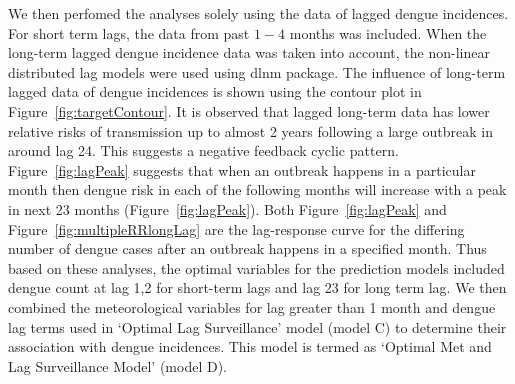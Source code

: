 \documentclass{bmcart}
\begin{document}
We then perfomed the analyses solely using the data of lagged dengue incidences. For short term lags, the data from past $1-4$ months was included. When the long-term lagged dengue incidence data was taken into account, the non-linear distributed lag models were used using dlnm package\cite{gasparrini2011distributed}. The influence of long-term lagged data of dengue incidences is shown using the contour plot in Figure~\ref{fig:targetContour}. It is observed that lagged long-term data has lower relative risks of transmission up to almost 2 years following a large outbreak in around lag 24. This suggests a negative feedback cyclic pattern. Figure~\ref{fig:lagPeak} suggests that when an outbreak happens in a particular month then dengue risk in each of the following months will increase with a peak in next 23 months (Figure~\ref{fig:lagPeak}). Both Figure~\ref{fig:lagPeak} and Figure~\ref{fig:multipleRRlongLag} are the lag-response curve for the differing number of dengue cases after an outbreak happens in a specified month. Thus based on these  analyses, the optimal variables for the prediction models included dengue count at lag 1,2 for short-term lags and lag 23 for long term lag. We then combined the meteorological variables for lag greater than 1 month and dengue lag terms used in `Optimal Lag Surveillance' model (model C) to determine their association with dengue incidences. This model is termed as `Optimal Met and Lag Surveillance Model' (model D). 


\end{document}
